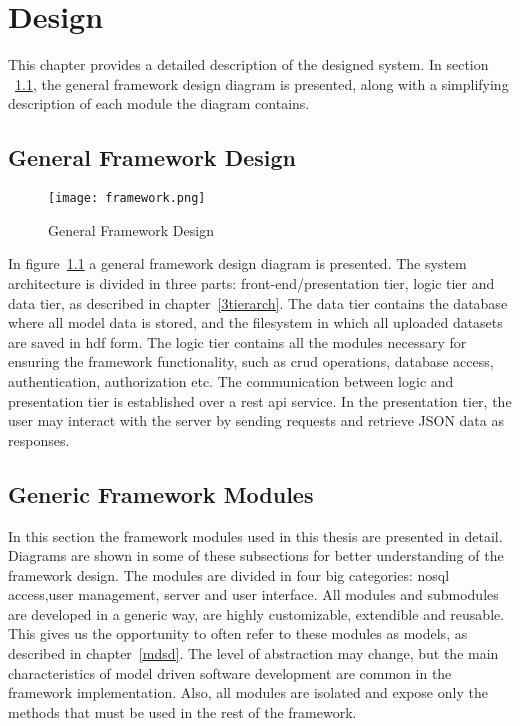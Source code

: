 
\chapter{Design} %

This chapter provides a detailed description of the designed system. In section ~\ref{gfd}, the general framework design diagram is presented, along with a simplifying description of each module the diagram contains. 


\section{General Framework Design}
\label{gfd}
\begin{figure}
	\texttt{[image: framework.png]}
	\caption{General Framework Design}
	\label{framework}
\end{figure}
In figure~\ref{framework} a general framework design diagram is presented. The system architecture is divided in three parts: front-end/presentation tier, logic tier and data tier, as described in chapter~\ref{3tierarch}. The data tier contains the database where all model data is stored, and the filesystem in which all uploaded datasets are saved in hdf form. The logic tier contains all the modules necessary for ensuring the framework functionality, such as crud operations, database access, authentication, authorization etc. The communication between logic and presentation tier is established over a rest api service. In the presentation tier, the user may interact with the server by sending requests and retrieve JSON data as responses.

\section{Generic Framework Modules}
In this section the framework modules used in this thesis are presented in detail. Diagrams are shown in some of these subsections for better understanding of the framework design. The modules are divided in four big categories: nosql access,user management, server and user interface. All modules and submodules are developed in a generic way, are highly customizable, extendible and reusable. This gives us the opportunity to often refer to these modules as models, as described in chapter~\ref{mdsd}. The level of abstraction may change, but the main characteristics of model driven software development are common in the framework implementation. Also, all modules are isolated and expose only the methods that must be used in the rest of the framework.



